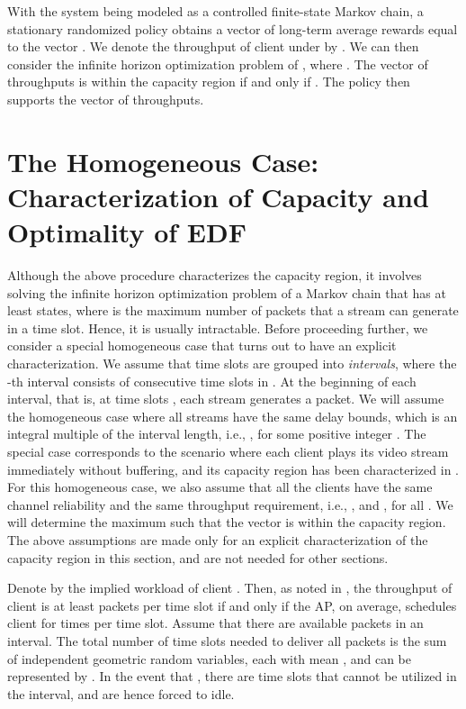 \documentclass[10pt,nocopyrightspace]{sigplan-proc-varsize-1in}
\begin{document}
With the system being modeled as a controlled finite-state Markov chain, a stationary randomized policy  obtains a vector of long-term average rewards equal to the vector . We denote the throughput   of client  under  by . We can then consider the infinite horizon optimization problem of , where . The vector of throughputs is within the capacity region if and only if . The policy  then supports the vector of throughputs.

\section{The Homogeneous Case: Characterization of Capacity and Optimality of EDF}

Although the above procedure characterizes the capacity region, it involves solving the infinite horizon optimization problem of a Markov chain that has at least  states, where  is the maximum number of packets that a stream can generate in a time slot. Hence, it is usually intractable. Before proceeding further, we consider a special homogeneous case that turns out to have an explicit characterization. We assume that time slots are grouped into \emph{intervals}, where the -th interval consists of  consecutive time slots in . At the beginning of each interval, that is, at time slots , each stream generates a packet. We will assume the homogeneous case where all streams have the same delay bounds, which is an integral multiple of the interval length, i.e., , for some positive integer . The special case  corresponds to the scenario where each client plays its video stream immediately without buffering, and its capacity region has been characterized in \cite{IH09}. For this homogeneous case, we also assume that all the clients have the same channel reliability and the same throughput requirement, i.e., , and , for all . We will determine the maximum  such that the vector  is within the capacity region. The above assumptions are made only for an explicit characterization of the capacity region in this section, and are not needed for other sections.

Denote by  the implied workload of client . Then, as noted in \cite{IH09}, the throughput of client  is at least  packets per time slot if and only if the AP, on average, schedules client  for  times per time slot. Assume that there are  available packets in an interval. The total number of time slots needed to deliver all  packets is the sum of  independent geometric random variables, each with mean , and can be represented by . In the event that , there are  time slots that cannot be utilized in the interval, and are hence forced to idle.
\end{document}
